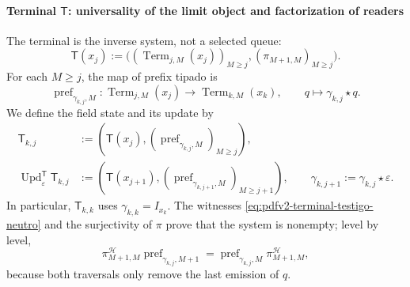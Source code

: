 \paragraph{Terminal \(\mathsf T\): universality of the limit object and factorization of readers}
The terminal is the inverse system, not a selected queue:
\begin{equation}
\label{eq:pdfv2-terminal-sistema-inverso-campo}
 \mathsf T(x_j):=
 \bigl((\operatorname{Term}_{j,M}(x_j))_{M\geq j},
       (\pi_{M+1,M})_{M\geq j}\bigr).
\end{equation}
For each \(M\geq j\), the map of prefix tipado is
\begin{equation}
\label{eq:pdfv2-terminal-update-t}
 \operatorname{pref}_{\gamma_{k,j},M}:
 \operatorname{Term}_{j,M}(x_j)\longrightarrow
 \operatorname{Term}_{k,M}(x_k),\qquad
 q\longmapsto\gamma_{k,j}\star q.
\end{equation}
We define the field state and its update by
\begin{align}
 \mathsf T_{k,j}
 &:=
 \left(\mathsf T(x_j),
   (\operatorname{pref}_{\gamma_{k,j},M})_{M\geq j}\right),
 \label{eq:pdfv2-terminal-estado-t}\\
 \operatorname{Upd}^{\mathsf T}_{\varepsilon}\mathsf T_{k,j}
 &:=
 \left(\mathsf T(x_{j+1}),
   (\operatorname{pref}_{\gamma_{k,j+1},M})_{M\geq j+1}\right),
 \qquad \gamma_{k,j+1}:=\gamma_{k,j}\star\varepsilon.
 \label{eq:pdfv2-terminal-update-t-explicita}
\end{align}
In particular, \(\mathsf T_{k,k}\) uses
\(\gamma_{k,k}=I_{x_k}\). The witnesses
\eqref{eq:pdfv2-terminal-testigo-neutro} and the surjectivity of \(\pi\)
prove that the system is nonempty; level by level,
\begin{equation}
\label{eq:pdfv2-terminal-prefijo-natural}
 \pi^{\mathscr H}_{M+1,M}
 \operatorname{pref}_{\gamma_{k,j},M+1}
 =\operatorname{pref}_{\gamma_{k,j},M}
  \pi^{\mathscr H}_{M+1,M},
\end{equation}
because both traversals only remove the last emission of \(q\).

